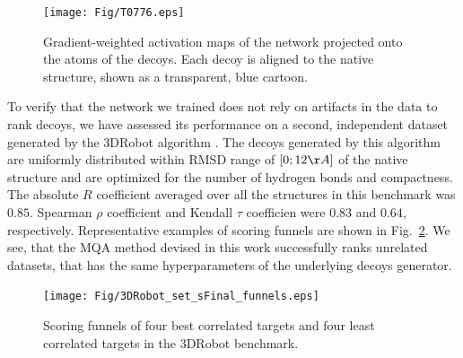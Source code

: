 \begin{figure}[H]
    \centering
    \texttt{[image: Fig/T0776.eps]}
%
    \caption{Gradient-weighted activation maps of the network
    projected onto the atoms of the decoys. Each decoy is aligned to
    the native structure, shown as a transparent, blue cartoon.}
%
    \label{Fig:GradCAMT0776_more}
\end{figure}

To verify that the network we trained does not rely on artifacts in
the data to rank decoys, we have assessed its performance on a second,
independent dataset generated by the 3DRobot
algorithm \cite{deng20163drobot}. The decoys generated by this
algorithm are uniformly distributed within RMSD range of $[0; 12\AA]$
of the native structure and are optimized for the number of hydrogen
bonds and compactness.
%
%
The absolute  $R$ coefficient averaged over all the
structures in this benchmark was $0.85$. Spearman $\rho$ coefficient
and Kendall $\tau$ coefficien were $0.83$ and $0.64$, respectively.
Representative examples of scoring funnels are shown in
Fig.~\ref{Fig:3DRobotBenchmark}.  We see, that the MQA method devised
in this work successfully ranks unrelated datasets, that has the same
hyperparameters of the underlying decoys generator.

\begin{figure}[H]
    \centering
    \texttt{[image: Fig/3DRobot\_set\_sFinal\_funnels.eps]}
%
    \caption{Scoring funnels of four best correlated targets and four
    least correlated targets in the 3DRobot benchmark.}
%
    \label{Fig:3DRobotBenchmark}
\end{figure}
